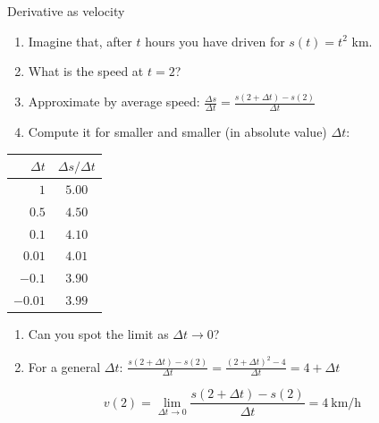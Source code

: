 \documentclass[9pt]{beamer}
\begin{document}
\begin{frame}{Derivative as velocity}

\begin{enumerate}[leftmargin=0.5cm, label=$\bullet$, rightmargin=0.2cm]
  \item Imagine that, after $t$ hours you have driven for $s(t)=t^2$ km.
  \item What is the speed at $t = 2$?
  \item Approximate by average speed:
  $
    \frac{\Delta s}{\Delta t} = \frac{s(2+\Delta t)-s(2)}{\Delta t}
  $
  \item Compute it for smaller and smaller (in absolute value) $\Delta t$:
\end{enumerate}
\begin{center}
\begin{tabular}{r c}
\textbf{$\Delta t$} & \textbf{$\Delta s/\Delta t$}\\
\hline
$1$      & $5.00$\\
$0.5$    & $4.50$\\
$0.1$    & $4.10$\\
$0.01$   & $4.01$\\
${-}0.1$  & $3.90$\\
${-}0.01$ & $3.99$
\end{tabular}    
\end{center}
\begin{enumerate}[leftmargin=0.5cm, label=$\bullet$, rightmargin=0.2cm]
\item Can you spot the limit as $\Delta t \rightarrow 0$?
\item For a general $\Delta t$:
$
\frac{s(2+\Delta t)-s(2)}{\Delta t}
=\frac{(2+\Delta t)^2-4}{\Delta t}
=4+\Delta t
$
\end{enumerate}
$$
\boxed{\,v(2)=\lim_{\Delta t\to 0}\frac{s(2+\Delta t)-s(2)}{\Delta t}=4\ \text{km/h}\,}
$$

\end{frame}
\end{document}
